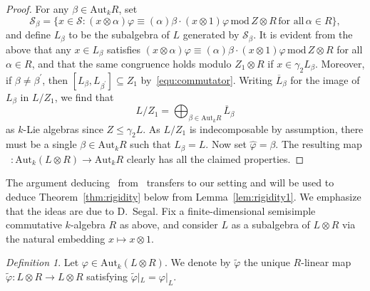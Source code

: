 \documentclass[11pt,a4paper]{amsart}
\theoremstyle{plain}
\theoremstyle{remark}
\newtheorem{dfn}[thm]{Definition}
\newcommand{\tensor}{\otimes}
\begin{document}
\begin{proof}
For any $\beta \in \mathrm{Aut}_k R$, set
$$ \mathcal{S}_\beta = \{ x \in \mathcal{S} : (x \otimes \alpha)\varphi \equiv (\alpha)\beta \cdot (x \otimes 1)\varphi \, \mathrm{mod} \, Z \otimes R \, \text{for all} \, \alpha \in R \},$$
and define $L_\beta$ to be the subalgebra of $L$ generated by $\mathcal{S}_\beta$.  It is evident from the above that any $x \in L_\beta$ satisfies $(x \otimes \alpha)\varphi \equiv (\alpha)\beta \cdot (x \otimes 1)\varphi \, \mathrm{mod} \, Z \otimes R$ for all $\alpha \in R$, and that the same congruence holds modulo $Z_1 \tensor R$ if $x \in \gamma_2 L_\beta$.  Moreover, if $\beta \neq \beta^\prime$, then $[L_\beta, L_{\beta^\prime}] \subseteq Z_1$ by~\eqref{equ:commutator}.  Writing $\overline{L}_\beta$ for the image of $L_\beta$ in $L / Z_1$, we find that 
$$L / Z_1 = \bigoplus_{\beta \in \mathrm{Aut}_k R} \overline{L}_\beta$$
as $k$-Lie algebras since $Z \leq \gamma_2 L$.  As $L /  Z_1$ is indecomposable by assumption, there must be a single $\beta \in \mathrm{Aut}_k R$ such that $L_\beta = L$.  Now set $\widehat{\varphi} = \beta$.  The resulting map \, $\widehat{} : \mathrm{Aut}_k (L \otimes R) \to \mathrm{Aut}_k R$ clearly has all the claimed properties.
\end{proof}



The argument deducing~\cite[Theorem~2]{Segal/89} from~\cite[Lemma~1]{Segal/89} transfers to our setting and will be used to deduce Theorem~\ref{thm:rigidity} below from Lemma~\ref{lem:rigidity1}.  We emphasize that the ideas are due to D.~Segal.  Fix a finite-dimensional semisimple commutative $k$-algebra $R$ as above, and consider $L$ as a subalgebra of $L \otimes R$ via the natural embedding $x \mapsto x \otimes 1$.

\begin{dfn} \label{def:varphi}
Let $\varphi \in \mathrm{Aut}_k (L \otimes R)$.  We denote by $\widetilde{\varphi}$ the unique $R$-linear map $\widetilde{\varphi} : L \otimes R \to L \otimes R$ satisfying $\widetilde{\varphi} |_L = \varphi |_L$.
\end{dfn}
\end{document}
